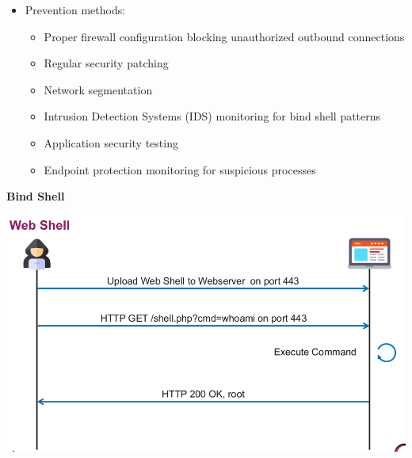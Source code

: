 \begin{itemize}
	\item Prevention methods:
    \begin{itemize}
        \tightlist
		\item Proper firewall configuration blocking unauthorized outbound connections
		\item Regular security patching
		\item Network segmentation
		\item Intrusion Detection Systems (IDS) monitoring for bind shell patterns
		\item Application security testing
		\item Endpoint protection monitoring for suspicious processes
    \end{itemize}
\end{itemize}

\textbf{Bind Shell}
\begin{center}
    \includegraphics[scale=0.5]{resources/02-web-shell.png}
\end{center}
